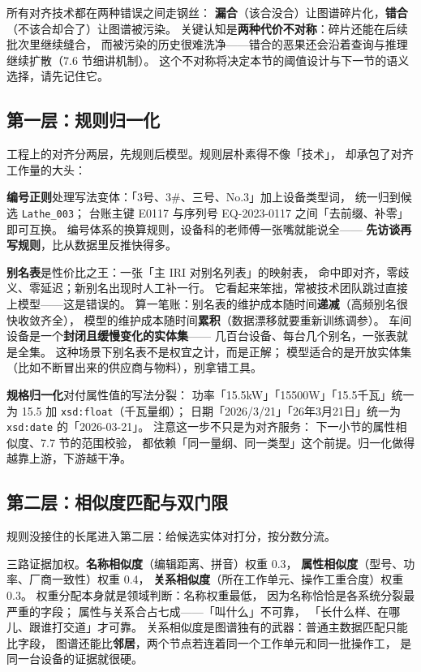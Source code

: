 所有对齐技术都在两种错误之间走钢丝：
\textbf{漏合}（该合没合）让图谱碎片化，\textbf{错合}（不该合却合了）让图谱被污染。
关键认知是\textbf{两种代价不对称}：碎片还能在后续批次里继续缝合，
而被污染的历史很难洗净——错合的恶果还会沿着查询与推理继续扩散（7.6 节细讲机制）。
这个不对称将决定本节的阈值设计与下一节的语义选择，请先记住它。

\subsection{第一层：规则归一化}

工程上的对齐分两层，先规则后模型。规则层朴素得不像「技术」，
却承包了对齐工作量的大头：



\textbf{编号正则}处理写法变体：「3号、3\#、三号、No.3」加上设备类型词，
统一归到候选 \texttt{Lathe\_003}；
台账主键 E0117 与序列号 EQ-2023-0117 之间「去前缀、补零」即可互换。
编号体系的换算规则，设备科的老师傅一张嘴就能说全——
\textbf{先访谈再写规则}，比从数据里反推快得多。

\textbf{别名表}是性价比之王：一张「主 IRI 对别名列表」的映射表，
命中即对齐，零歧义、零延迟；新别名出现时人工补一行。
它看起来笨拙，常被技术团队跳过直接上模型——这是错误的。
算一笔账：别名表的维护成本随时间\textbf{递减}（高频别名很快收敛齐全），
模型的维护成本随时间\textbf{累积}（数据漂移就要重新训练调参）。
车间设备是一个\textbf{封闭且缓慢变化的实体集}——
几百台设备、每台几个别名，一张表就是全集。
这种场景下别名表不是权宜之计，而是正解；
模型适合的是开放实体集（比如不断冒出来的供应商与物料），别拿错工具。

\textbf{规格归一化}对付属性值的写法分裂：
功率「15.5kW」「15500W」「15.5千瓦」统一为 15.5 加 \texttt{xsd:float}（千瓦量纲）；
日期「2026/3/21」「26年3月21日」统一为 \texttt{xsd:date} 的「2026-03-21」。
注意这一步不只是为对齐服务：
下一小节的属性相似度、7.7 节的范围校验，
都依赖「同一量纲、同一类型」这个前提。归一化做得越靠上游，下游越干净。

\subsection{第二层：相似度匹配与双门限}

规则没接住的长尾进入第二层：给候选实体对打分，按分数分流。



三路证据加权。\textbf{名称相似度}（编辑距离、拼音）权重 0.3，
\textbf{属性相似度}（型号、功率、厂商一致性）权重 0.4，
\textbf{关系相似度}（所在工作单元、操作工重合度）权重 0.3。
权重分配本身就是领域判断：名称权重最低，
因为名称恰恰是各系统分裂最严重的字段；
属性与关系合占七成——「叫什么」不可靠，
「长什么样、在哪儿、跟谁打交道」才可靠。
关系相似度是图谱独有的武器：普通主数据匹配只能比字段，
图谱还能比\textbf{邻居}，两个节点若连着同一个工作单元和同一批操作工，
是同一台设备的证据就很硬。

